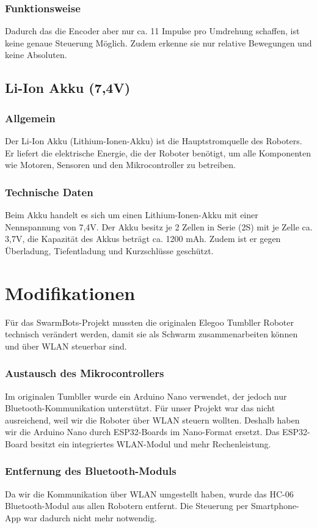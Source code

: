 \subsubsection{Funktionsweise}
Dadurch das die Encoder aber nur ca. 11 Impulse pro Umdrehung schaffen, ist keine genaue Steuerung Möglich. 
Zudem erkenne sie nur relative Bewegungen und keine Absoluten.
%
\subsection{Li-Ion Akku (7,4V)}
%
\subsubsection{Allgemein}
Der Li-Ion Akku (Lithium-Ionen-Akku) ist die Hauptstromquelle des Roboters. 
Er liefert die elektrische Energie, die der Roboter benötigt, um alle Komponenten wie Motoren, Sensoren und den Mikrocontroller zu betreiben.
\subsubsection{Technische Daten}
Beim Akku handelt es sich um einen Lithium-Ionen-Akku mit einer Nennspannung von 7,4V. 
Der Akku besitz je 2 Zellen in Serie (2S) mit je Zelle ca. 3,7V, die Kapazität des Akkus beträgt ca. 1200 mAh. Zudem ist er gegen Überladung, Tiefentladung und Kurzschlüsse geschützt. 
%

\section{Modifikationen}
\label{subsec:hardware_modifikationen}
Für das SwarmBots-Projekt mussten die originalen Elegoo Tumbller Roboter technisch verändert werden, damit sie als Schwarm zusammenarbeiten können und über WLAN steuerbar sind.
\subsubsection{Austausch des Mikrocontrollers}
Im originalen Tumbller wurde ein Arduino Nano verwendet, der jedoch nur Bluetooth-Kommunikation unterstützt.
Für unser Projekt war das nicht ausreichend, weil wir die Roboter über WLAN steuern wollten.
Deshalb haben wir die Arduino Nano durch ESP32-Boards im Nano-Format ersetzt.
Das ESP32-Board besitzt ein integriertes WLAN-Modul und mehr Rechenleistung.
\subsubsection{Entfernung des Bluetooth-Moduls}
Da wir die Kommunikation über WLAN umgestellt haben, wurde das HC-06 Bluetooth-Modul aus allen Robotern entfernt.
Die Steuerung per Smartphone-App war dadurch nicht mehr notwendig.
